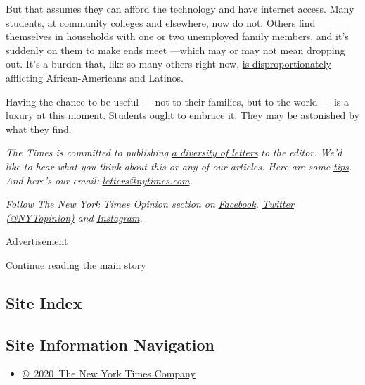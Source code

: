 But that assumes they can afford the technology and have internet
access. Many students, at community colleges and elsewhere, now do not.
Others find themselves in households with one or two unemployed family
members, and it's suddenly on them to make ends meet ---which may or may
not mean dropping out. It's a burden that, like so many others right
now,
\href{https://www.insidehighered.com/news/2020/06/17/pandemic-has-worsened-equity-gaps-higher-education-and-work}{is
disproportionately} afflicting African-Americans and Latinos.

Having the chance to be useful --- not to their families, but to the
world --- is a luxury at this moment. Students ought to embrace it. They
may be astonished by what they find.

\emph{The Times is committed to publishing}
\href{https://www.nytimes.com/2019/01/31/opinion/letters/letters-to-editor-new-york-times-women.html}{\emph{a
diversity of letters}} \emph{to the editor. We'd like to hear what you
think about this or any of our articles. Here are some}
\href{https://help.nytimes.com/hc/en-us/articles/115014925288-How-to-submit-a-letter-to-the-editor}{\emph{tips}}\emph{.
And here's our email:}
\href{mailto:letters@nytimes.com}{\emph{letters@nytimes.com}}\emph{.}

\emph{Follow The New York Times Opinion section on}
\href{https://www.facebook.com/nytopinion}{\emph{Facebook}}\emph{,}
\href{http://twitter.com/NYTOpinion}{\emph{Twitter (@NYTopinion)}}
\emph{and}
\href{https://www.instagram.com/nytopinion/}{\emph{Instagram}}\emph{.}

Advertisement

\protect\hyperlink{after-bottom}{Continue reading the main story}

\hypertarget{site-index}{%
\subsection{Site Index}\label{site-index}}

\hypertarget{site-information-navigation}{%
\subsection{Site Information
Navigation}\label{site-information-navigation}}

\begin{itemize}
\tightlist
\item
  \href{https://help.nytimes.com/hc/en-us/articles/115014792127-Copyright-notice}{©~2020~The
  New York Times Company}
\end{itemize}


